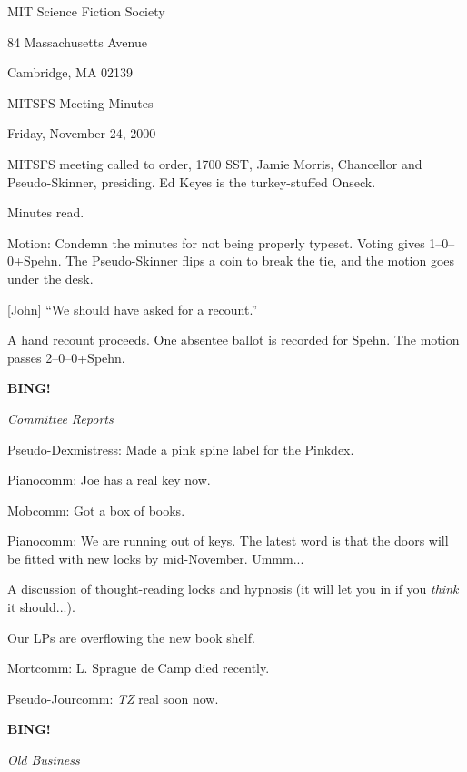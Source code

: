 \documentclass[12pt]{article}
\newcommand{\bing}{{\bf BING!} }
\newcommand{\goto}[1]{\bing \vskip 12pt \centerline{{\em{#1}}}}
\begin{document}
\begin{center}

MIT Science Fiction Society 

84 Massachusetts Avenue

Cambridge, MA 02139

\vspace{12pt}

MITSFS Meeting Minutes 

Friday, November 24, 2000

\end{center}
 
\vspace{18pt}

\setlength{\parskip}{6pt}

\noindent
MITSFS meeting called to order, 1700 SST, Jamie Morris, Chancellor and
Pseudo-Skinner, presiding.  Ed Keyes is the turkey-stuffed Onseck.

Minutes read.

Motion: Condemn the minutes for not being properly typeset.  Voting
gives 1--0--0+Spehn.  The Pseudo-Skinner flips a coin to break the
tie, and the motion goes under the desk.

[John] ``We should have asked for a recount.''


A hand recount proceeds.  One absentee ballot is recorded for Spehn.
The motion passes 2--0--0+Spehn.

\goto{Committee Reports}

Pseudo-Dexmistress: Made a pink spine label for the Pinkdex.

Pianocomm: Joe has a real key now.

Mobcomm: Got a box of books.

Pianocomm: We are running out of keys.  The latest word is that the
doors will be fitted with new locks by mid-November.  Ummm...

A discussion of thought-reading locks and hypnosis (it will let you
in if you {\em think} it should...).

Our LPs are overflowing the new book shelf.

Mortcomm: L. Sprague de Camp died recently.

Pseudo-Jourcomm: {\em TZ} real soon now.

\goto{Old Business}
\end{document}
